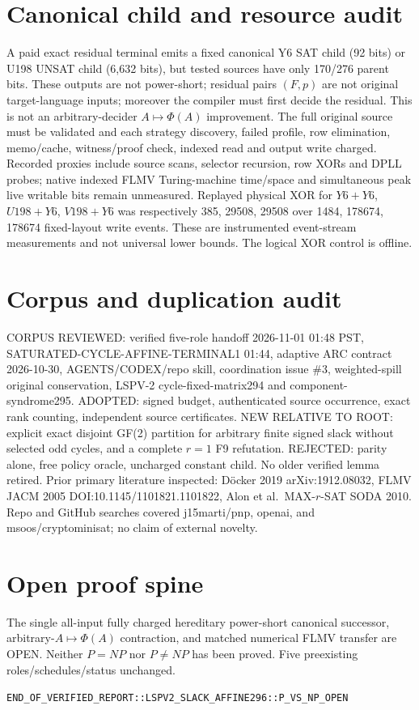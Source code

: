 \documentclass[11pt]{article}
\begin{document}
\section*{Canonical child and resource audit}
A paid exact residual terminal emits a fixed canonical Y6 SAT child (92 bits) or U198 UNSAT child (6,632 bits), but tested sources have only 170/276 parent bits. These outputs are not power-short; residual pairs $(F,p)$ are not original target-language inputs; moreover the compiler must first decide the residual. This is not an arbitrary-decider $A\mapsto\Phi(A)$ improvement. The full original source must be validated and each strategy discovery, failed profile, row elimination, memo/cache, witness/proof check, indexed read and output write charged. Recorded proxies include source scans, selector recursion, row XORs and DPLL probes; native indexed FLMV Turing-machine time/space and simultaneous peak live writable bits remain unmeasured. Replayed physical XOR for $Y6+Y6$, $U198+Y6$, $V198+Y6$ was respectively 385, 29508, 29508 over 1484, 178674, 178674 fixed-layout write events. These are instrumented event-stream measurements and not universal lower bounds. The logical XOR control is offline.
\section*{Corpus and duplication audit}
CORPUS REVIEWED: verified five-role handoff 2026-11-01 01:48 PST, SATURATED-CYCLE-AFFINE-TERMINAL1 01:44, adaptive ARC contract 2026-10-30, AGENTS/CODEX/repo skill, coordination issue \#3, weighted-spill original conservation, LSPV-2 cycle-fixed-matrix294 and component-syndrome295. ADOPTED: signed budget, authenticated source occurrence, exact rank counting, independent source certificates. NEW RELATIVE TO ROOT: explicit exact disjoint GF(2) partition for arbitrary finite signed slack without selected odd cycles, and a complete $r=1$ F9 refutation. REJECTED: parity alone, free policy oracle, uncharged constant child. No older verified lemma retired. Prior primary literature inspected: D\"ocker 2019 arXiv:1912.08032, FLMV JACM 2005 DOI:10.1145/1101821.1101822, Alon et al.\ MAX-$r$-SAT SODA 2010. Repo and GitHub searches covered j15marti/pnp, openai, and msoos/cryptominisat; no claim of external novelty.
\section*{Open proof spine}
The single all-input fully charged hereditary power-short canonical successor, arbitrary-$A\mapsto\Phi(A)$ contraction, and matched numerical FLMV transfer are OPEN. Neither $P=NP$ nor $P\ne NP$ has been proved. Five preexisting roles/schedules/status unchanged.
\par\noindent\texttt{END\_OF\_VERIFIED\_REPORT::LSPV2\_SLACK\_AFFINE296::P\_VS\_NP\_OPEN}
\end{document}
